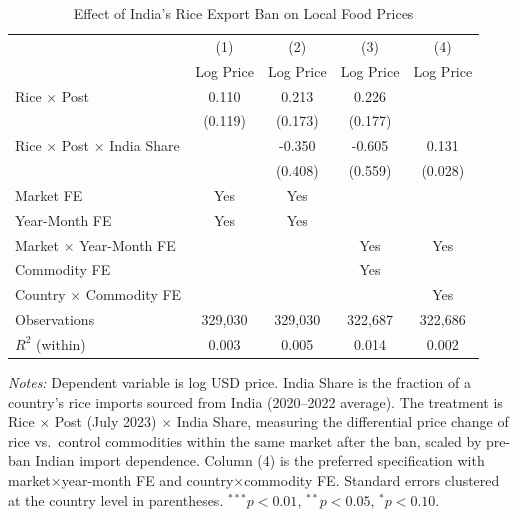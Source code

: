 \begin{table}[htbp]
\centering
\caption{Effect of India's Rice Export Ban on Local Food Prices}
\label{tab:main}
\begin{threeparttable}
\begin{tabular}{lcccc}
\hline\hline
 & (1) & (2) & (3) & (4) \\
 & Log Price & Log Price & Log Price & Log Price \\
\hline
Rice $\times$ Post & 0.110 & 0.213 & 0.226 & \\
 & (0.119) & (0.173) & (0.177) & \\
Rice $\times$ Post $\times$ India Share & & -0.350 & -0.605 & 0.131 \\
 & & (0.408) & (0.559) & (0.028) \\
\hline
Market FE & Yes & Yes & & \\
Year-Month FE & Yes & Yes & & \\
Market $\times$ Year-Month FE & & & Yes & Yes \\
Commodity FE & & & Yes & \\
Country $\times$ Commodity FE & & & & Yes \\
Observations & 329,030 & 329,030 & 322,687 & 322,686 \\
$R^2$ (within) & 0.003 & 0.005 & 0.014 & 0.002 \\
\hline\hline
\end{tabular}
\begin{tablenotes}[flushleft]\small
\item \textit{Notes:} Dependent variable is log USD price. India Share is the fraction of a country's rice imports sourced from India (2020--2022 average). The treatment is Rice $\times$ Post (July 2023) $\times$ India Share, measuring the differential price change of rice vs.\ control commodities within the same market after the ban, scaled by pre-ban Indian import dependence. Column (4) is the preferred specification with market$\times$year-month FE and country$\times$commodity FE. Standard errors clustered at the country level in parentheses. $^{***}p<0.01$, $^{**}p<0.05$, $^{*}p<0.10$.
\end{tablenotes}
\end{threeparttable}
\end{table}
